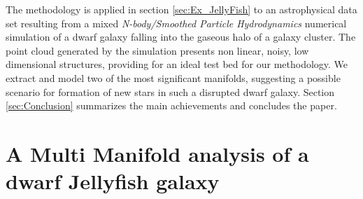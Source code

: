 The methodology is applied in section \ref{sec:Ex_JellyFish} to an astrophysical data set resulting from a {mixed \emph{N-body/Smoothed Particle Hydrodynamics}} numerical simulation of a dwarf galaxy falling into the gaseous halo of a galaxy cluster. {The point cloud generated by the simulation presents non linear, noisy, low dimensional structures, providing for an ideal test bed for our methodology.} We extract and model two of the most significant manifolds, suggesting a possible scenario for formation of new stars in such a disrupted dwarf galaxy.
Section \ref{sec:Conclusion} summarizes the main achievements and concludes the paper.



\section{A Multi Manifold analysis of a dwarf Jellyfish galaxy}\label{sec:manifold_jellyfish}

